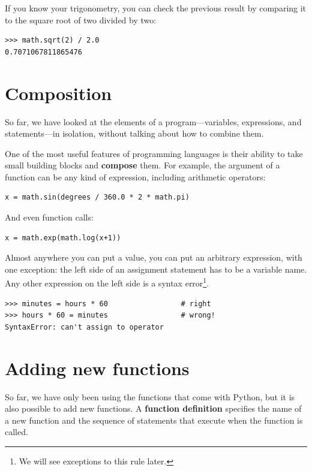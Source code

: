 \documentclass[10pt]{book}
\begin{document}

If you know
your trigonometry, you can check the previous result by comparing it to
the square root of two divided by two:


\beforeverb
\begin{verbatim}
>>> math.sqrt(2) / 2.0
0.7071067811865476
\end{verbatim}
\afterverb
%

\section{Composition}

So far, we have looked at the elements of a program---variables,
expressions, and statements---in isolation, without talking about how to
combine them.

One of the most useful features of programming languages is their
ability to take small building blocks and {\bf compose} them.  For
example, the argument of a function can be any kind of expression,
including arithmetic operators:

\beforeverb
\begin{verbatim}
x = math.sin(degrees / 360.0 * 2 * math.pi)
\end{verbatim}
\afterverb
%
And even function calls:

\beforeverb
\begin{verbatim}
x = math.exp(math.log(x+1))
\end{verbatim}
\afterverb
%
Almost anywhere you can put a value, you can put an arbitrary
expression, with one exception: the left side of an assignment
statement has to be a variable name.  Any other expression on the left
side is a syntax error\footnote{We will see exceptions to this rule
later.}.

\beforeverb
\begin{verbatim}
>>> minutes = hours * 60                 # right
>>> hours * 60 = minutes                 # wrong!
SyntaxError: can't assign to operator
\end{verbatim}
\afterverb
%


\section{Adding new functions}

So far, we have only been using the functions that come with Python,
but it is also possible to add new functions.
A {\bf function definition} specifies the name of a new function and
the sequence of statements that execute when the function is called.
\end{document}
